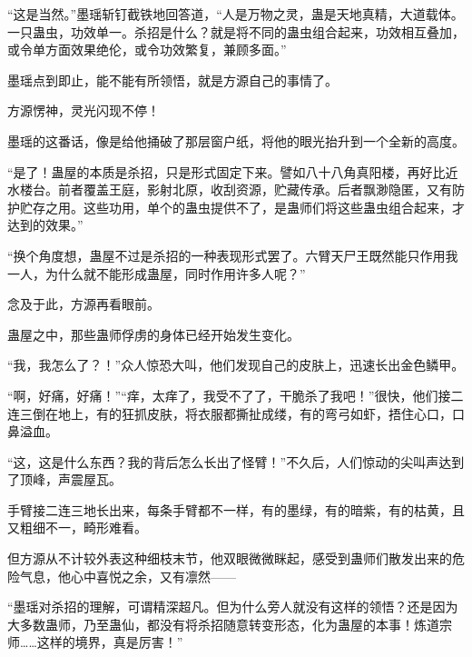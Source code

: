 \begin{this_body}
“这是当然。”墨瑶斩钉截铁地回答道，“人是万物之灵，蛊是天地真精，大道载体。一只蛊虫，功效单一。杀招是什么？就是将不同的蛊虫组合起来，功效相互叠加，或令单方面效果绝伦，或令功效繁复，兼顾多面。”

墨瑶点到即止，能不能有所领悟，就是方源自己的事情了。

方源愣神，灵光闪现不停！

墨瑶的这番话，像是给他捅破了那层窗户纸，将他的眼光抬升到一个全新的高度。

“是了！蛊屋的本质是杀招，只是形式固定下来。譬如八十八角真阳楼，再好比近水楼台。前者覆盖王庭，影射北原，收刮资源，贮藏传承。后者飘渺隐匿，又有防护贮存之用。这些功用，单个的蛊虫提供不了，是蛊师们将这些蛊虫组合起来，才达到的效果。”

“换个角度想，蛊屋不过是杀招的一种表现形式罢了。六臂天尸王既然能只作用我一人，为什么就不能形成蛊屋，同时作用许多人呢？”

念及于此，方源再看眼前。

蛊屋之中，那些蛊师俘虏的身体已经开始发生变化。

“我，我怎么了？！”众人惊恐大叫，他们发现自己的皮肤上，迅速长出金色鳞甲。

“啊，好痛，好痛！”“痒，太痒了，我受不了了，干脆杀了我吧！”很快，他们接二连三倒在地上，有的狂抓皮肤，将衣服都撕扯成缕，有的弯弓如虾，捂住心口，口鼻溢血。

“这，这是什么东西？我的背后怎么长出了怪臂！”不久后，人们惊动的尖叫声达到了顶峰，声震屋瓦。

手臂接二连三地长出来，每条手臂都不一样，有的墨绿，有的暗紫，有的枯黄，且又粗细不一，畸形难看。

但方源从不计较外表这种细枝末节，他双眼微微眯起，感受到蛊师们散发出来的危险气息，他心中喜悦之余，又有凛然——

“墨瑶对杀招的理解，可谓精深超凡。但为什么旁人就没有这样的领悟？还是因为大多数蛊师，乃至蛊仙，都没有将杀招随意转变形态，化为蛊屋的本事！炼道宗师……这样的境界，真是厉害！”

\end{this_body}

